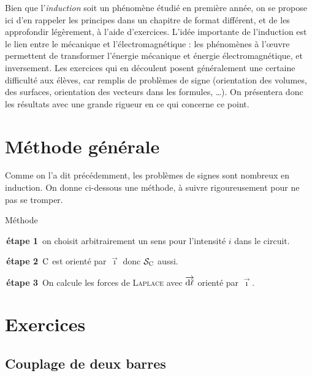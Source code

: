 \documentclass[a4paper,french,bookmarks]{book}
\newcommand{\chaptertoc}[0]{
    \setcounter{tocdepth}{2}
    \begin{tcolorbox}[
        enhanced,
        frame hidden,
        sharp corners,
        detach title,
        spread outwards     = 5pt,
        halign              = center,
        valign              = center,
        borderline west     = {3pt}{0pt}{main20!50!main2!95!gray!90},
        coltitle            = main20!50!main2!95!gray!90, 
        interior style      = {
            left color      = main1white2!65!gray!11,
            middle color    = main1white2!50!gray!10,
            right color     = main1white2!35!gray!9
        },
        arc                 = 0 cm,
        title               = SOMMAIRE,
        boxrule             = 0pt,
        fonttitle           = \bfseries\sffamily,
        overlay             = {
            \node[rotate=90, minimum width=1cm, anchor=south,yshift=-0.8cm]
            at (frame.west) {\tcbtitle};
        }
    ]
        \begin{minipage}{0.83\linewidth}
            \sffamily
            \minitoc
        \end{minipage}
    \end{tcolorbox}
}
\begin{document}
    Bien que l'\emph{induction} soit un phénomène étudié en première année, on se propose ici d'en rappeler les principes dans un chapitre de format différent, et de les approfondir légèrement, à l'aide d'exercices. L'idée importante de l'induction est le lien entre le mécanique et l'électromagnétique : les phénomènes à l'\oe{}uvre permettent de transformer l'énergie mécanique et énergie électromagnétique, et inversement. Les exercices qui en découlent posent généralement une certaine difficulté aux élèves, car remplis de problèmes de signe (orientation des volumes, des surfaces, orientation des vecteurs dans les formules, \dots). On présentera donc les résultats avec une grande rigueur en ce qui concerne ce point.
    
    \chaptertoc{}
    
    \section{Méthode générale}
    
    Comme on l'a dit précédemment, les problèmes de signes sont nombreux en induction. On donne ci-dessous une méthode, à suivre rigoureusement pour ne pas se tromper.
    
    \begin{form}{Méthode}{}
        \begin{enumerate}
            \itt \colorbox{colform!20}{\textnormal{\color{colform}\sffamily\bfseries \,étape 1\,}} on choisit arbitrairement un sens pour l'intensité $i$ dans le circuit.
            
            \itt \colorbox{colform!20}{\textnormal{\color{colform}\sffamily\bfseries \,étape 2\,}} $\text C$ est orienté par $\vec \imath$ donc $\mathcal{S}_\text C$ aussi.
            
            \itt \colorbox{colform!20}{\textnormal{\color{colform}\sffamily\bfseries \,étape 3\,}} On calcule les forces de \textsc{Laplace} avec $\overrightarrow{\mathrm d \ell}$ orienté par $\vec \imath$.
        \end{enumerate}
    \end{form}
    
    \section{Exercices}
    
    \subsection{Couplage de deux barres}
    
\end{document}
